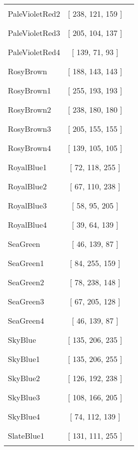 \begin{tabular}{|l|c|c|}
PaleVioletRed2 & [ 238, 121, 159 ] & \color{PaleVioletRed2} \rule{1cm}{1.5ex}\\
PaleVioletRed3 & [ 205, 104, 137 ] & \color{PaleVioletRed3} \rule{1cm}{1.5ex}\\
PaleVioletRed4 & [ 139, 71, 93 ] & \color{PaleVioletRed4} \rule{1cm}{1.5ex}\\
RosyBrown & [ 188, 143, 143 ] & \color{RosyBrown} \rule{1cm}{1.5ex}\\
RosyBrown1 & [ 255, 193, 193 ] & \color{RosyBrown1} \rule{1cm}{1.5ex}\\
RosyBrown2 & [ 238, 180, 180 ] & \color{RosyBrown2} \rule{1cm}{1.5ex}\\
RosyBrown3 & [ 205, 155, 155 ] & \color{RosyBrown3} \rule{1cm}{1.5ex}\\
RosyBrown4 & [ 139, 105, 105 ] & \color{RosyBrown4} \rule{1cm}{1.5ex}\\
RoyalBlue1 & [ 72, 118, 255 ] & \color{RoyalBlue1} \rule{1cm}{1.5ex}\\
RoyalBlue2 & [ 67, 110, 238 ] & \color{RoyalBlue2} \rule{1cm}{1.5ex}\\
RoyalBlue3 & [ 58, 95, 205 ] & \color{RoyalBlue3} \rule{1cm}{1.5ex}\\
RoyalBlue4 & [ 39, 64, 139 ] & \color{RoyalBlue4} \rule{1cm}{1.5ex}\\
SeaGreen & [ 46, 139, 87 ] & \color{SeaGreen} \rule{1cm}{1.5ex}\\
SeaGreen1 & [ 84, 255, 159 ] & \color{SeaGreen1} \rule{1cm}{1.5ex}\\
SeaGreen2 & [ 78, 238, 148 ] & \color{SeaGreen2} \rule{1cm}{1.5ex}\\
SeaGreen3 & [ 67, 205, 128 ] & \color{SeaGreen3} \rule{1cm}{1.5ex}\\
SeaGreen4 & [ 46, 139, 87 ] & \color{SeaGreen4} \rule{1cm}{1.5ex}\\
SkyBlue & [ 135, 206, 235 ] & \color{SkyBlue} \rule{1cm}{1.5ex}\\
SkyBlue1 & [ 135, 206, 255 ] & \color{SkyBlue1} \rule{1cm}{1.5ex}\\
SkyBlue2 & [ 126, 192, 238 ] & \color{SkyBlue2} \rule{1cm}{1.5ex}\\
SkyBlue3 & [ 108, 166, 205 ] & \color{SkyBlue3} \rule{1cm}{1.5ex}\\
SkyBlue4 & [ 74, 112, 139 ] & \color{SkyBlue4} \rule{1cm}{1.5ex}\\
SlateBlue1 & [ 131, 111, 255 ] & \color{SlateBlue1} \rule{1cm}{1.5ex}\\

\end{tabular}
